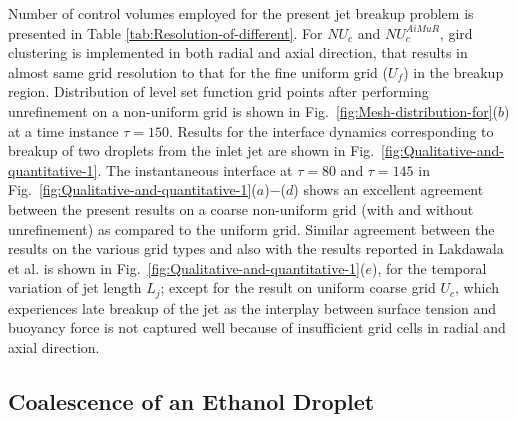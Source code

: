 \documentclass[preprint,12pt]{elsarticle}
\begin{document}
Number of control volumes employed for the present jet breakup problem is presented in Table \ref{tab:Resolution-of-different}. For
$NU_{c}$ and $NU_{c}^{AiMuR}$, gird clustering is implemented in both radial and axial
direction, that results in almost same grid resolution to that for the fine
uniform grid ($U_{f}$) in the breakup region. Distribution of level
set function grid points after performing unrefinement on a non-uniform
grid is shown in Fig.~\ref{fig:Mesh-distribution-for}($b$) at a time instance $\tau=150$. Results for the interface dynamics corresponding to breakup of two droplets from the inlet jet are shown in Fig.~\ref{fig:Qualitative-and-quantitative-1}. The instantaneous interface at $\tau=80$ and $\tau=145$ in Fig.~\ref{fig:Qualitative-and-quantitative-1}($a$)$-$($d$) shows an excellent agreement between the present results on a coarse non-uniform grid (with and without unrefinement) as compared to the uniform grid. Similar agreement between the results on the various grid types and also with the results reported in Lakdawala
et al. \cite{lakdawala2014} is shown in Fig.~\ref{fig:Qualitative-and-quantitative-1}($e$), for the temporal variation of jet length $L_{j}$; except for the result on uniform coarse grid $U_{c}$, which experiences late breakup of the jet as the interplay
between surface tension and buoyancy force is not captured well because
of insufficient grid cells in radial and axial direction.
\subsection{Coalescence of an Ethanol Droplet}\label{sub:Coalescence-of-an}
\end{document}
